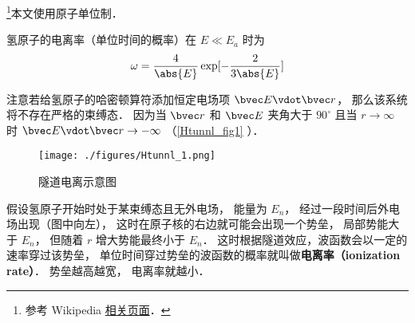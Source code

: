 
\footnote{参考 Wikipedia \href{https://en.wikipedia.org/wiki/Tunnel_ionization}{相关页面}．}本文使用原子单位制．

氢原子的电离率（单位时间的概率）在 $E \ll E_a$ 时为
\begin{equation}
\omega = \frac{4}{\abs{E}} \exp[-\frac{2}{3\abs{E}}]
\end{equation}


注意若给氢原子的哈密顿算符添加恒定电场项 $\bvec E \vdot \bvec r$， 那么该系统将不存在严格的束缚态． 因为当 $\bvec r$ 和 $\bvec E$ 夹角大于 $90^\circ$ 且当 $r\to\infty$ 时 $\bvec E \vdot \bvec r \to -\infty$ （\autoref{Htunnl_fig1} ）．

\begin{figure}[ht]
\centering
\texttt{[image: ./figures/Htunnl\_1.png]}
\caption{隧道电离示意图} \label{Htunnl_fig1}
\end{figure}

假设氢原子开始时处于某束缚态且无外电场， 能量为 $E_n$， 经过一段时间后外电场出现（图中向左）， 这时在原子核的右边就可能会出现一个势垒， 局部势能大于 $E_n$， 但随着 $r$ 增大势能最终小于 $E_n$． 这时根据隧道效应，波函数会以一定的速率穿过该势垒， 单位时间穿过势垒的波函数的概率就叫做\textbf{电离率（ionization rate）}． 势垒越高越宽， 电离率就越小．


